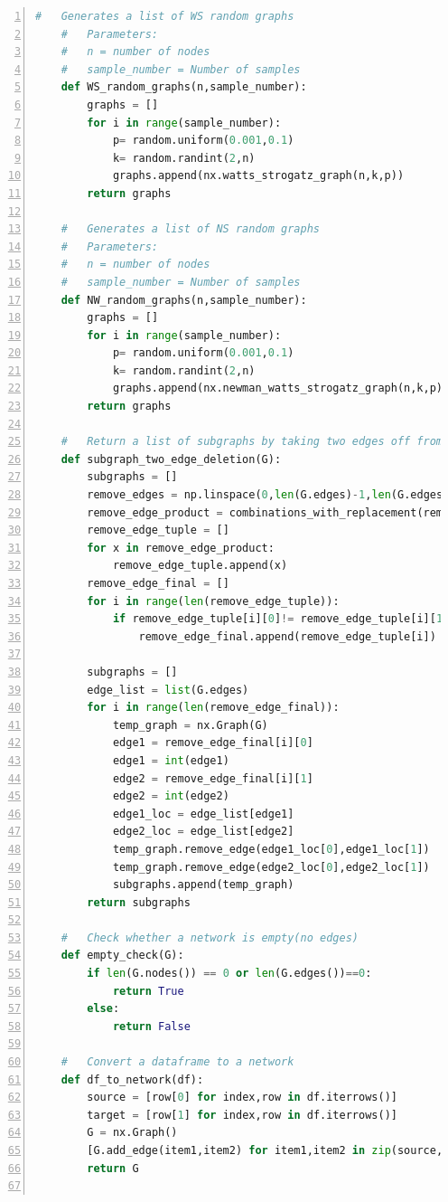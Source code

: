 \documentclass[12pt]{article}
\begin{document}
\begin{lstlisting}[numbers=left,language=Python,breaklines=true]
    #   Generates a list of WS random graphs
    #   Parameters:
    #   n = number of nodes
    #   sample_number = Number of samples
    def WS_random_graphs(n,sample_number):
        graphs = []
        for i in range(sample_number):
            p= random.uniform(0.001,0.1)
            k= random.randint(2,n)
            graphs.append(nx.watts_strogatz_graph(n,k,p))
        return graphs
    
    #   Generates a list of NS random graphs
    #   Parameters:
    #   n = number of nodes
    #   sample_number = Number of samples
    def NW_random_graphs(n,sample_number):
        graphs = []
        for i in range(sample_number):
            p= random.uniform(0.001,0.1)
            k= random.randint(2,n)
            graphs.append(nx.newman_watts_strogatz_graph(n,k,p))
        return graphs
    
    #   Return a list of subgraphs by taking two edges off from the graph
    def subgraph_two_edge_deletion(G):
        subgraphs = []
        remove_edges = np.linspace(0,len(G.edges)-1,len(G.edges))
        remove_edge_product = combinations_with_replacement(remove_edges,2)
        remove_edge_tuple = []
        for x in remove_edge_product:
            remove_edge_tuple.append(x)
        remove_edge_final = []
        for i in range(len(remove_edge_tuple)):
            if remove_edge_tuple[i][0]!= remove_edge_tuple[i][1]:
                remove_edge_final.append(remove_edge_tuple[i])
        
        subgraphs = []
        edge_list = list(G.edges)
        for i in range(len(remove_edge_final)):
            temp_graph = nx.Graph(G)
            edge1 = remove_edge_final[i][0]
            edge1 = int(edge1)
            edge2 = remove_edge_final[i][1]
            edge2 = int(edge2)
            edge1_loc = edge_list[edge1]
            edge2_loc = edge_list[edge2]
            temp_graph.remove_edge(edge1_loc[0],edge1_loc[1])
            temp_graph.remove_edge(edge2_loc[0],edge2_loc[1])
            subgraphs.append(temp_graph)
        return subgraphs
    
    #   Check whether a network is empty(no edges)
    def empty_check(G):
        if len(G.nodes()) == 0 or len(G.edges())==0:
            return True
        else:
            return False
    
    #   Convert a dataframe to a network
    def df_to_network(df):
        source = [row[0] for index,row in df.iterrows()]
        target = [row[1] for index,row in df.iterrows()]
        G = nx.Graph()
        [G.add_edge(item1,item2) for item1,item2 in zip(source,target)]
        return G
    

\end{lstlisting}
\end{document}
